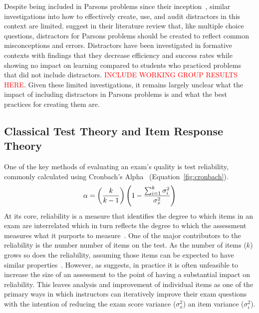 \documentclass[authorversion,nonacm]{acmart}
\begin{document}
Despite being included in Parsons problems since their
inception~\cite{parsons2006parson}, similar investigations into how to
effectively create, use, and audit distractors in this context are limited.
\citet{du2020review} suggest in their literature review that, like multiple
choice questions, distractors for Parsons problems should be created to reflect
common misconceptions and errors. Distractors have been investigated in
formative contexts with \citet{harms2016distractors} findings that they decrease
efficiency and success rates while showing no impact on learning compared to
students who practiced problems that did not include distractors.
\textcolor{red}{INCLUDE WORKING GROUP RESULTS HERE}. Given these limited
investigations, it remains largely unclear what the impact of including 
distractors in Parsons problems is and what the best practices for creating
them are.


\subsection{Classical Test Theory and Item Response Theory}

One of the key methods of evaluating an exam's quality is test reliability,
commonly calculated using Cronbach's Alpha~\cite{cronbach1951coefficient}
(Equation~\ref{fig:cronbach}). 
\begin{equation}
    \alpha =\left({k \over k-1}\right)\left(1-{\sum _{i=1}^{k}\sigma
    _{i}^{2} \over \sigma _{x}^{2}}\right)
\end{equation}\label{fig:cronbach}
At its core, reliability is a measure that identifies the degree to which
items in an exam are interrelated which in turn reflects the degree to which the
assessment measures what it purports to measure~\cite{lord2008statistical,
ebel1967relation, ebel1972essentials}.  
One of the major contributors to the reliability is the number number of items on
the test. As the number of items ($k$) grows so does the reliability, assuming those items can be expected to have
similar properties~\cite{ebel1967relation, allen2001introduction, ebel1972essentials}.
However, as \citet{ebel1967relation} suggests, in practice it is often
unfeasible to increase the size of an assessment to the point of having a
substantial impact on reliability. This leaves 
analysis and improvement of individual items as one of the primary ways in
which instructors can iteratively improve their exam questions with the
intention of reducing the exam score variance ($\sigma^2_x$) an item variance 
($\sigma^2_i$).
\end{document}
